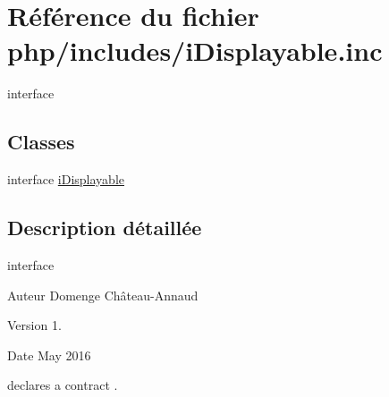 \hypertarget{i_displayable_8inc}{}\section{Référence du fichier php/includes/i\+Displayable.inc}
\label{i_displayable_8inc}


interface  


\subsection*{Classes}
\begin{DoxyCompactItemize}
\item 
interface \hyperlink{interfacei_displayable}{i\+Displayable}
\end{DoxyCompactItemize}


\subsection{Description détaillée}
interface 

\begin{DoxyAuthor}{Auteur}
Domenge Château-\/\+Annaud 
\end{DoxyAuthor}
\begin{DoxyVersion}{Version}
1. 
\end{DoxyVersion}
\begin{DoxyDate}{Date}
May 2016
\end{DoxyDate}
declares a contract . 